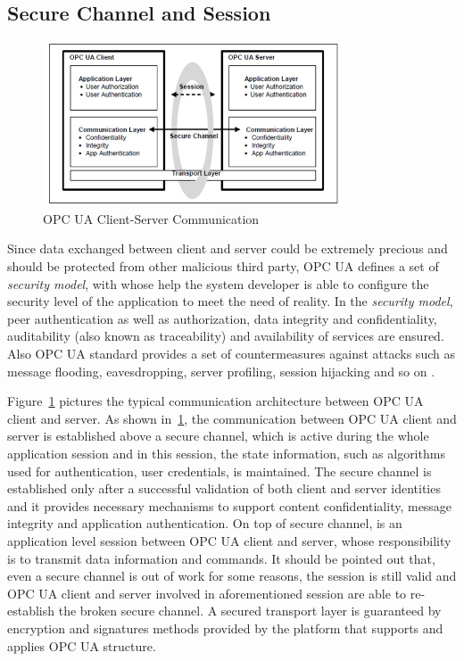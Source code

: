 \subsection{Secure Channel and Session}

\begin{figure}[!htbp]
	\centering
	\includegraphics[width=0.8\textwidth]{opc_ua_cs_comm.jpg}
		\caption{OPC UA Client-Server Communication \cite{O2}}
	\label{fig:opc_ua_cs_comm}
\end{figure}

Since data exchanged between client and server could be extremely precious and should be protected from other malicious third party, OPC UA defines a set of  \emph{security model}, with whose help the system developer is able to  configure the security level of the application to meet the need of reality. In the \emph{security model}, peer authentication as well as authorization, data integrity and confidentiality, auditability (also known as traceability) and availability of services are ensured. Also OPC UA  standard provides a set of countermeasures against attacks such as message flooding, eavesdropping, server profiling, session hijacking and so on \cite{O2}.


Figure~\ref{fig:opc_ua_cs_comm} pictures the typical communication architecture between OPC UA client and server. As shown in~\ref{fig:opc_ua_cs_comm}, the communication between OPC UA client and server is established above a secure channel, which is active during the whole application session and in this session, the state information, such as algorithms used for authentication, user credentials, is maintained. The secure channel is established only after a successful validation of both client and server identities and it provides necessary mechanisms to support content confidentiality, message integrity and application authentication. On top of secure channel, is an application level session between OPC UA client and server, whose responsibility is to transmit data information and commands. It should be pointed out that, even a secure channel is out of work for some reasons, the session is still valid and OPC UA client and server involved in aforementioned session are able to re-establish the broken secure channel. A secured transport layer is guaranteed by encryption and signatures methods provided by the platform that supports and applies OPC UA structure.

